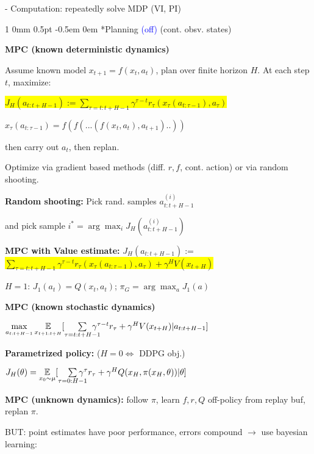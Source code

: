 \documentclass[11pt,landscape,a4paper,fleqn]{article}
\makeatletter
\newcommand*{\rsection}{%
	\@startsection{section}%
	{1}%
	{0mm}%
	{0.5pt}%
	{-0.5em \@plus 0em}
	{\color{myorange}\sffamily\small\bfseries}}
\newcommand{\mhl}[1]{\setlength{\fboxsep}{0pt}\colorbox{yellow}{#1}}
\makeatother
\begin{document}
\begin{multicols*}{4}
- Computation: repeatedly solve MDP (VI, PI)


\rsection*{Planning} \textcolor{blue}{(off)} (cont. obsv. states)

\textbf{MPC (known deterministic dynamics)}

Assume known model $x_{t+1} = f(x_t, a_t)$, plan over finite horizon $H$. At each step $t$, maximize:

\mhl{$J_H(a_{t:t+H-1}) := \sum_{\tau = t:t+H-1} \gamma^{\tau - t} r_\tau(x_\tau(a_{t:\tau-1}), a_\tau)$}

$x_\tau(a_{t:\tau-1}) = f(f(...(f(x_t, a_t), a_{t+1})..))$

then carry out $a_t$, then replan.

Optimize via gradient based methods (diff. $r, f$, cont. action) or via random shooting.

\vspace*{-2mm}
\textbf{Random shooting:} Pick rand. samples $a_{t:t+H-1}^{(i)}$

\vspace*{-1mm}
and pick sample $i^* = \arg\max_i J_H(a_{t:t+H-1}^{(i)})$

\textbf{MPC with Value estimate:} $J_H(a_{t:t+H-1}) :=$
\mhl{$\sum_{\tau = t:t+H-1} \gamma^{\tau - t} r_\tau(x_\tau(a_{t:\tau-1}), a_\tau) + \gamma^H V(x_{t+H})$}

$H=1$: $J_1(a_t) = Q(x_t, a_t)$; $\pi_G = \arg\max_a J_1(a)$

\textbf{MPC (known stochastic dynamics)}

{\fontsize{10}{6}\selectfont $\max\limits_{a_{t:t+H-1}} \underset{x_{t+1:t+H}}{\mathbb{E}} [ \sum\limits_{\tau = t:t+H-1} \hspace*{-4mm} \gamma^{\tau - t} r_\tau + \gamma^H V(x_{t+H}) | a_{t:t+H-1} ]$}


\textbf{Parametrized policy:} ($H = 0 \Leftrightarrow$ DDPG obj.)

$J_H(\theta) = \underset{x_0 \sim \mu}{\mathbb{E}} [ \sum\limits_{\tau = 0:H-1} \hspace*{-4mm} \gamma^{\tau} r_\tau + \gamma^H Q(x_{H}, \pi(x_H, \theta)) | \theta ]$

\textbf{MPC (unknown dynamics):} follow $\pi$, learn $f, r, Q$ off-policy from replay buf, replan $\pi$.

BUT: point estimates have poor performance, errors compound $\rightarrow$ use bayesian learning:


\end{multicols*}
\end{document}
